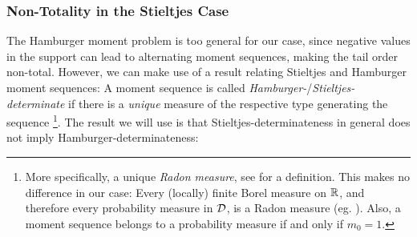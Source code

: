 \documentclass[a4paper]{scrreprt}
\theoremstyle{definition}
\newtheorem{thm}{Theorem}[chapter] %
\begin{document}
%    

    \subsubsection{Non-Totality in the Stieltjes Case}
    The Hamburger moment problem is too general for our case, since negative values in the support can lead to alternating moment sequences, making the tail order non-total.
    However, we can make use of a result relating Stieltjes and Hamburger moment sequences:
    A moment sequence is called \emph{Hamburger-}/\emph{Stieltjes-determinate} if there is a \emph{unique} measure of the respective type generating the sequence \cite[p.68]{bib:schmuedgenTheMomentProblem}
    \footnote{More specifically, a unique \emph{Radon measure}, see \cite[A.1]{bib:schmuedgenTheMomentProblem} for a definition. This makes no difference in our case: Every (locally) finite Borel measure on $\mathbb{R}$, and therefore every probability measure in $\mathcal{D}$, is a Radon measure (eg. \cite[Proposition II.3.1]{bib:malliavinIntegrationAndProbability}). Also, a moment sequence belongs to a probability measure if and only if $m_0 = 1$.}.
    The result we will use is that Stieltjes-determinateness in general does not imply Hamburger-determinateness:
    
\end{document}
